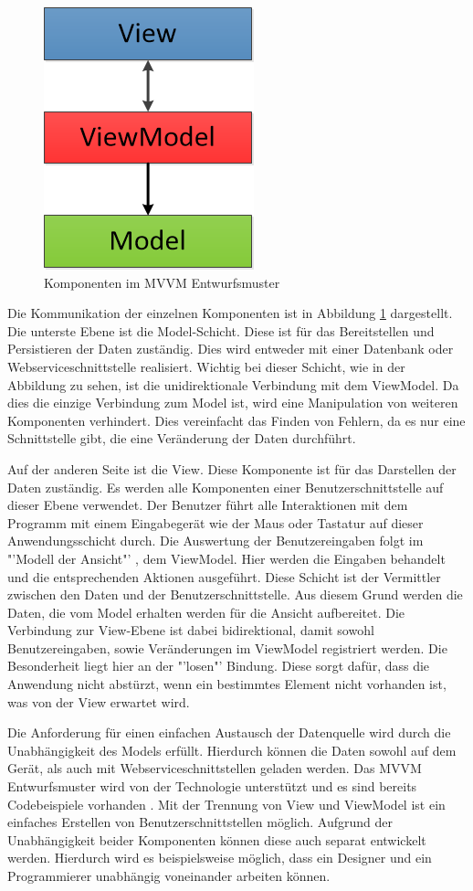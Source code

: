 \begin{figure}
\centering
\includegraphics{images/mvvm}
\caption{Komponenten im MVVM Entwurfsmuster}
\label{mvvm}
\end{figure}
Die Kommunikation der einzelnen Komponenten ist in Abbildung \ref{mvvm} dargestellt. Die unterste Ebene ist die Model-Schicht. Diese ist für das Bereitstellen und Persistieren der Daten zuständig. Dies wird entweder mit einer Datenbank oder Webserviceschnittstelle realisiert. Wichtig bei dieser Schicht, wie in der Abbildung zu sehen, ist die unidirektionale Verbindung mit dem ViewModel. Da dies die einzige Verbindung zum Model ist, wird eine Manipulation von weiteren Komponenten verhindert. Dies vereinfacht das Finden von Fehlern, da es nur eine Schnittstelle gibt, die eine Veränderung der Daten durchführt. \par
Auf der anderen Seite ist die View. Diese Komponente ist für das Darstellen der Daten zuständig. Es werden alle Komponenten einer Benutzerschnittstelle auf dieser Ebene verwendet. Der Benutzer führt alle Interaktionen mit dem Programm mit einem Eingabegerät wie der Maus oder Tastatur auf dieser Anwendungsschicht durch. Die Auswertung der Benutzereingaben folgt im "'Modell der Ansicht"' \cite[S.9]{bib:mvvm}, dem ViewModel. Hier werden die Eingaben behandelt und die entsprechenden Aktionen ausgeführt. Diese Schicht ist der Vermittler zwischen den Daten und der Benutzerschnittstelle. Aus diesem Grund werden die Daten, die vom Model erhalten werden für die Ansicht aufbereitet. Die Verbindung zur View-Ebene ist dabei bidirektional, damit sowohl Benutzereingaben, sowie Veränderungen im ViewModel registriert werden. Die Besonderheit liegt hier an der "'losen"' Bindung. Diese sorgt dafür, dass die Anwendung nicht abstürzt, wenn ein bestimmtes Element nicht vorhanden ist, was von der View erwartet wird. 
\par 
Die Anforderung für einen einfachen Austausch der Datenquelle wird durch die Unabhängigkeit des Models erfüllt. Hierdurch können die Daten sowohl auf dem Gerät, als auch mit Webserviceschnittstellen geladen werden. Das MVVM Entwurfsmuster wird von der Technologie unterstützt und es sind bereits Codebeispiele vorhanden \cite{bib:winMvvm}. Mit der Trennung von View und ViewModel ist ein einfaches Erstellen von Benutzerschnittstellen möglich. Aufgrund der Unabhängigkeit beider Komponenten können diese auch separat entwickelt werden. Hierdurch wird es beispielsweise möglich, dass ein Designer und ein Programmierer unabhängig voneinander arbeiten können. 

